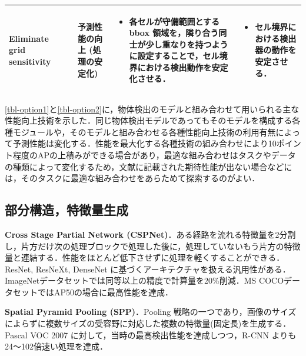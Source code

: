 \documentclass[originalpaper,fleqn]{jsaiart}     %
\begin{document}
\begin{table}
\begin{center}
\begin{tabularx}{\linewidth}{Xp{1.5cm}Xp{7cm}X}
            Eliminate grid sensitivity
            & \cite{BWL20} & 予測性能の向上 (処理の安定化) & 
            \begin{itemize}
                \vspace{-0.7\baselineskip}
                \setlength{\leftskip}{-3mm}
                \item 各セルが守備範囲とする bbox 領域を，隣り合う同士が少し重なりを持つように設定することで，セル境界における検出動作を安定化させる．
            \end{itemize}
            &
            \begin{itemize}
                \vspace{-0.7\baselineskip}
                \setlength{\leftskip}{-3mm}
                \item セル境界における検出器の動作を安定させる．
            \end{itemize}
            \\
            \bottomrule
        \end{tabularx}
    \end{center}
\end{table}%

\ref{tbl-option1}と\ref{tbl-option2}に，物体検出のモデルと組み合わせて用いられる主な性能向上技術を示した．同じ物体検出モデルであってもそのモデルを構成する各種モジュールや，そのモデルと組み合わせる各種性能向上技術の利用有無によって予測性能は変化する．性能を最大化する各種技術の組み合わせにより10ポイント程度のAPの上積みができる場合があり，最適な組み合わせはタスクやデータの種類によって変化するため，文献に記載された期待性能が出ない場合などには，そのタスクに最適な組み合わせをあらためて探索するのがよい．

\subsection{部分構造，特徴量生成}
{\bf Cross Stage Partial Network (CSPNet)}\cite{WLWCHY20}．ある経路を流れる特徴量を2分割し，片方だけ次の処理ブロックで処理した後に，処理していないもう片方の特徴量と連結する．性能をほとんど低下させずに処理を軽くすることができる．ResNet, ResNeXt, DenseNet に基づくアーキテクチャを扱える汎用性がある．
ImageNetデータセットでは同等以上の精度で計算量を20\%削減．MS COCOデータセットではAP50の場合に最高性能を達成．

{\bf Spatial Pyramid Pooling (SPP)}\cite{HZRS15,HZRS14}．Pooling 戦略の一つであり，画像のサイズによらずに複数サイズの受容野に対応した複数の特徴量(固定長)を生成する．Pascal VOC 2007 に対して，当時の最高検出性能を達成しつつ，R-CNN よりも 24〜102倍速い処理を達成．
\end{document}
